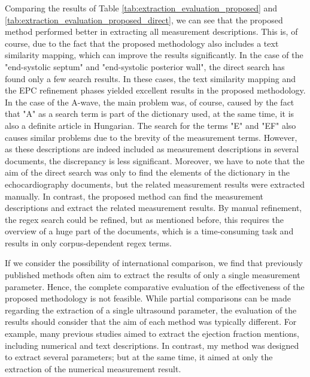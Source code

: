 Comparing the results of Table \ref{tab:extraction_evaluation_proposed} and \ref{tab:extraction_evaluation_proposed_direct}, we can see that the proposed method performed better in extracting all measurement descriptions. This is, of course, due to the fact that the proposed methodology also includes a text similarity mapping, which can improve the results significantly. In the case of the "end-systolic septum" and "end-systolic posterior wall", the direct search has found only a few search results. In these cases, the text similarity mapping and the EPC refinement phases yielded excellent results in the proposed methodology. In the case of the A-wave, the main problem was, of course, caused by the fact that "A" as a search term is part of the dictionary used, at the same time, it is also a definite article in Hungarian. The search for the terms "E" and "EF" also causes similar problems due to the brevity of the measurement terms. However, as these descriptions are indeed included as measurement descriptions in several documents, the discrepancy is less significant. Moreover, we have to note that the aim of the direct search was only to find the elements of the dictionary in the echocardiography documents, but the related measurement results were extracted manually. In contrast, the proposed method can find the measurement descriptions and extract the related measurement results. By manual refinement, the regex search could be refined, but as mentioned before, this requires the overview of a huge part of the documents, which is a time-consuming task and results in only corpus-dependent regex terms. 

\vspace{0.5cm}

If we consider the possibility of international comparison, we find that previously published methods often aim to extract the results of only a single measurement parameter. Hence, the complete comparative evaluation of the effectiveness of the proposed methodology is not feasible. While partial comparisons can be made regarding the extraction of a single ultrasound parameter, the evaluation of the results should consider that the aim of each method was typically different. For example, many previous studies aimed to extract the ejection fraction mentions, including numerical and text descriptions. In contrast, my method was designed to extract several parameters; but at the same time, it aimed at only the extraction of the numerical measurement result. 

